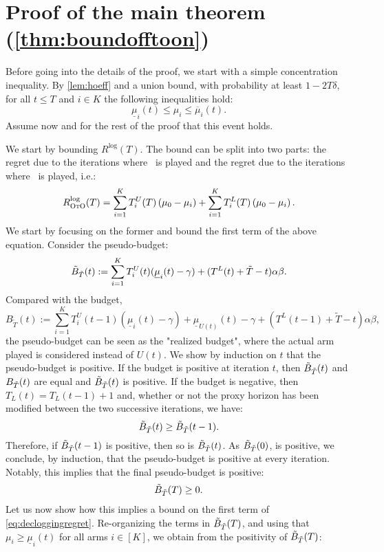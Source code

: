 
\section{Proof of the main theorem (\cref{thm:boundofftoon})} \label{sec:boundregretalgo}


Before going into the details of the proof, we start with a simple concentration inequality. By \cref{lem:hoeff} and a union bound, with probability at least $1-2T\delta$, for all $t\leq T$ and $i\in K$ the following inequalities hold:
\[
\underline{\mu}_i(t)\leq \mu_i \leq \overline{\mu}_i(t).
\]
 Assume now and for the rest of the proof that this event holds.  

We start by bounding $R^{\text{log}}(T)$. The bound can be split into two parts: the regret due to the iterations where \algucb\ is played and the regret due to the iterations where \alglcb\ is played, i.e.:
\begin{align}\label{eq:decloggingregret}
    R^{\text{log}}_\textsc{OtO}(T)=\sum_{i=1}^{K}T_i^{U}(T)\left(\mu_0-\mu_i\right)+\sum_{i=1}^{K}T_i^L(T)\left(\mu_0-\mu_i\right).
\end{align}
We start by focusing on the former and bound the first term of the above equation. Consider the pseudo-budget:
\[
\tilde{B}_{\Tilde{T}}(t):=\sum_{i=1}^{K}T_i^U(t)(\underline{\mu}_i(t)-\gamma)+(T^L(t)+\Tilde{T}-t)\alpha \beta.
\]
Compared with the budget, 
\[
B_{\tilde{T}}(t):=\sum_{i=1}^{K}T_i^U(t-1)(\underline{\mu}_i(t)-\gamma)+\underline{\mu}_{U(t)}(t)-\gamma+(T^L(t-1)+\tilde{T}-t)\alpha \beta,
\]
the pseudo-budget can be seen as the "realized budget", where the actual arm played is considered instead of $U(t)$.
We show by induction on $t$ that the pseudo-budget is positive. 
If the budget is positive at iteration  $t$, then   $\tilde{B}_{\Tilde{T}}(t)$ and $B_{\Tilde{T}}(t)$ are equal and $\tilde{B}_{\Tilde{T}}(t)$ is positive. If the budget is negative, then $T_L(t)=T_L(t-1)+1$ and,  whether or not the proxy horizon has been modified between the two successive iterations, we have:
\[
\tilde{B}_{\Tilde{T}}(t)\geq  \tilde{B}_{\Tilde{T}}(t-1).
\]
Therefore, if $\tilde{B}_{\Tilde{T}}(t-1)$ is positive, then so is $\tilde{B}_{\Tilde{T}}(t)$. As $\tilde{B}_{\Tilde{T}}(0)$, is positive, we conclude, by induction, that the pseudo-budget is positive at every iteration. Notably, this implies that the final pseudo-budget is positive:
\begin{align*}
    \tilde{B}_{\Tilde{T}}(T)\geq 0. 
\end{align*}
Let us now show how this implies a bound on the first term of \cref{eq:decloggingregret}. Re-organizing the terms in $\tilde{B}_{\Tilde{T}}(T)$, and using that $\mu_i\geq \underline{\mu}_i(t)$ for all arms $i \in [K]$, we obtain from the positivity of $\tilde{B}_{\Tilde{T}}(T)$:
